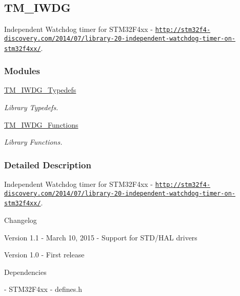 \hypertarget{group___t_m___i_w_d_g}{}\subsection{T\+M\+\_\+\+I\+W\+D\+G}
\label{group___t_m___i_w_d_g}


Independent Watchdog timer for S\+T\+M32\+F4xx -\/ \href{http://stm32f4-discovery.com/2014/07/library-20-independent-watchdog-timer-on-stm32f4xx/}{\tt http\+://stm32f4-\/discovery.\+com/2014/07/library-\/20-\/independent-\/watchdog-\/timer-\/on-\/stm32f4xx/}.  


\subsubsection*{Modules}
\begin{DoxyCompactItemize}
\item 
\hyperlink{group___t_m___i_w_d_g___typedefs}{T\+M\+\_\+\+I\+W\+D\+G\+\_\+\+Typedefs}
\begin{DoxyCompactList}\small\item\em Library Typedefs. \end{DoxyCompactList}\item 
\hyperlink{group___t_m___i_w_d_g___functions}{T\+M\+\_\+\+I\+W\+D\+G\+\_\+\+Functions}
\begin{DoxyCompactList}\small\item\em Library Functions. \end{DoxyCompactList}\end{DoxyCompactItemize}


\subsubsection{Detailed Description}
Independent Watchdog timer for S\+T\+M32\+F4xx -\/ \href{http://stm32f4-discovery.com/2014/07/library-20-independent-watchdog-timer-on-stm32f4xx/}{\tt http\+://stm32f4-\/discovery.\+com/2014/07/library-\/20-\/independent-\/watchdog-\/timer-\/on-\/stm32f4xx/}. 

\begin{DoxyParagraph}{Changelog}

\end{DoxyParagraph}
\begin{DoxyVerb} Version 1.1
  - March 10, 2015
  - Support for STD/HAL drivers

 Version 1.0
  - First release
\end{DoxyVerb}


\begin{DoxyParagraph}{Dependencies}

\end{DoxyParagraph}
\begin{DoxyVerb} - STM32F4xx
 - defines.h
\end{DoxyVerb}
 